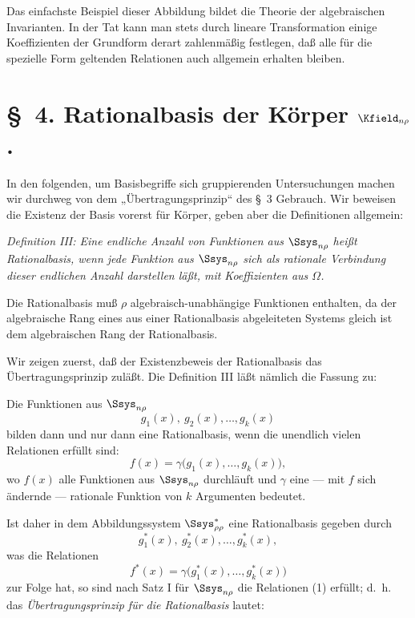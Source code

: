 \documentclass[11pt]{article}
\begin{document}
\providecommand{\Lsys}{\mathfrak{L}}
\providecommand{\Jdom}{\mathfrak{J}}

\clearpage
Das einfachste Beispiel dieser Abbildung bildet die Theorie der algebraischen Invarianten. In der Tat kann man stets durch lineare Transformation einige Koeffizienten der Grundform derart zahlenmäßig festlegen, daß alle für die spezielle Form geltenden Relationen auch allgemein erhalten bleiben.

\section*{\S\ 4. Rationalbasis der Körper $\Kfield_{n\rho}$.}

In den folgenden, um Basisbegriffe sich gruppierenden Untersuchungen machen wir durchweg von dem „Übertragungsprinzip“ des \S\ 3 Gebrauch. Wir beweisen die Existenz der Basis vorerst für Körper, geben aber die Definitionen allgemein:

\emph{Definition III: Eine endliche Anzahl von Funktionen aus $\Ssys_{n\rho}$ heißt Rationalbasis, wenn jede Funktion aus $\Ssys_{n\rho}$ sich als rationale Verbindung dieser endlichen Anzahl darstellen läßt, mit Koeffizienten aus $\Omega$.}

Die Rationalbasis muß $\rho$ algebraisch-unabhängige Funktionen enthalten, da der algebraische Rang eines aus einer Rationalbasis abgeleiteten Systems gleich ist dem algebraischen Rang der Rationalbasis.

Wir zeigen zuerst, daß der Existenzbeweis der Rationalbasis das Übertragungsprinzip zuläßt. Die Definition III läßt nämlich die Fassung zu:

Die Funktionen aus $\Ssys_{n\rho}$
\[
  g_1(x),\ g_2(x),\ldots, g_k(x)
\]
bilden dann und nur dann eine Rationalbasis, wenn die unendlich vielen Relationen erfüllt sind:
\begin{equation}
  f(x)=\gamma\bigl(g_1(x),\ldots,g_k(x)\bigr),
\tag{1}
\end{equation}
wo $f(x)$ alle Funktionen aus $\Ssys_{n\rho}$ durchläuft und $\gamma$ eine --- mit $f$ sich ändernde --- rationale Funktion von $k$ Argumenten bedeutet.

Ist daher in dem Abbildungssystem $\Ssys^*_{\rho\rho}$ eine Rationalbasis gegeben durch
\[
  g_1^*(x),\ g_2^*(x),\ldots, g_k^*(x),
\]
was die Relationen
\[
  f^*(x)=\gamma\bigl(g_1^*(x),\ldots,g_k^*(x)\bigr)
\]
zur Folge hat, so sind nach Satz I für $\Ssys_{n\rho}$ die Relationen (1) erfüllt; d.~h. das \emph{Übertragungsprinzip für die Rationalbasis} lautet:
\end{document}
